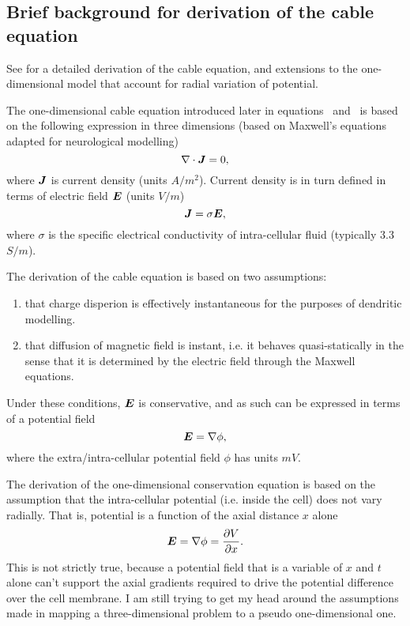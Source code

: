 \subsection{Brief background for derivation of the cable equation}
See \cite{lindsay_2004} for a detailed derivation of the cable equation, and extensions to the one-dimensional model that account for radial variation of potential.

The one-dimensional cable equation introduced later in equations~ and~ is based on the following expression in three dimensions (based on Maxwell's equations adapted for neurological modelling)
\begin{equation}
    \nabla \cdot \bm{J} = 0,
    \label{eq:J}
\end{equation}
where $\bm{J}$ is current density (units $A/m^2$).
Current density is in turn defined in terms of electric field $\bm{E}$ (units $V/m$)
\begin{equation}
    \bm{J} = \sigma \bm{E},
\end{equation}
where $\sigma$ is the specific electrical conductivity of intra-cellular fluid (typically 3.3 $S/m$).

The derivation of the cable equation is based on two assumptions:
\begin{enumerate}
    \item that charge disperion is effectively instantaneous for the purposes of dendritic modelling.
    \item that diffusion of magnetic field is instant, i.e. it behaves quasi-statically in the sense that it is determined by the electric field through the Maxwell equations.
\end{enumerate}
Under these conditions, $\bm{E}$ is conservative, and as such can be expressed in terms of a potential field
\begin{equation}
    \bm{E} = \nabla \phi,
\end{equation}
where the extra/intra-cellular potential field $\phi$ has units $mV$.

The derivation of the one-dimensional conservation equation  is based on the assumption that the intra-cellular potential (i.e. inside the cell) does not vary radially.
That is, potential is a function of the axial distance $x$ alone
\begin{equation}
    \bm{E} = \nabla \phi = \frac{\partial{V}}{\partial{x}}.
\end{equation}
This is not strictly true, because a potential field that is a variable of $x$ and $t$ alone can't support the axial gradients required to drive the potential difference over the cell membrane.
I am still trying to get my head around the assumptions made in mapping a three-dimensional problem to a pseudo one-dimensional one.

